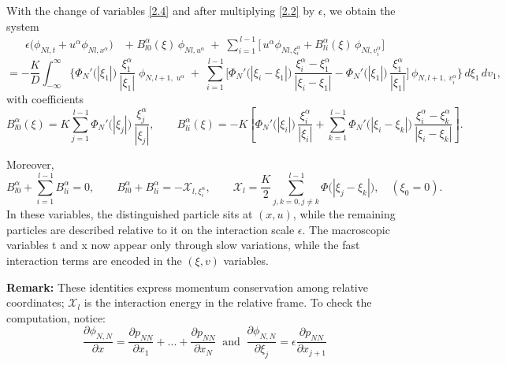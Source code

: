 \documentclass[11pt]{article}
\begin{document}
With the change of variables \eqref{2.4}  and after multiplying \eqref{2.2} by $\epsilon$, we obtain the system
\begin{equation*}\label{2.5}
\begin{aligned}
\epsilon\big(\phi_{Nl,t}+u^\alpha \phi_{Nl,x^\alpha}\big)
\;&+\; B_{l0}^\alpha(\xi)\,\phi_{Nl,u^\alpha}
\;+\; \sum_{i=1}^{\,l-1}\big[\,u^\alpha \phi_{Nl,\xi_i^\alpha}+B_{li}^\alpha(\xi)\,\phi_{Nl,v_i^\alpha}\big]
\end{aligned}
\tag{2.5}
\end{equation*}
\begin{equation*}
    =
-\frac{K}{D}\int_{-\infty}^{\infty}
\bigg\{
\Phi_N'\big(|\xi_1|\big)\,\frac{\xi_1^\alpha}{|\xi_1|}
\;\phi_{N,l+1,\;u^\alpha}
\;+\;
\sum_{i=1}^{\,l-1}
\bigg[
\Phi_N'\big(|\xi_i-\xi_1|\big)\,\frac{\xi_i^\alpha-\xi_1^\alpha}{|\xi_i-\xi_1|}
-
\Phi_N'\big(|\xi_1|\big)\,\frac{\xi_1^\alpha}{|\xi_1|}
\bigg]\,
\phi_{N,l+1,\;v_i^\alpha}
\bigg\}\,d\xi_1\,dv_1,
\end{equation*}
with coefficients
\begin{equation*}
B_{l0}^\alpha(\xi)=K\sum_{j=1}^{\,l-1}\Phi_N'\big(|\xi_j|\big)\,\frac{\xi_j^\alpha}{|\xi_j|},
\qquad
B_{li}^\alpha(\xi)
=-K\left[\Phi_N'\big(|\xi_i|\big)\,\frac{\xi_i^\alpha}{|\xi_i|}
+\sum_{k=1}^{\,l-1}\Phi_N'\big(|\xi_i-\xi_k|\big)\,\frac{\xi_i^\alpha-\xi_k^\alpha}{|\xi_i-\xi_k|}\right].
\end{equation*}

Moreover,
\[\tag{2.6}\label{2.6}
B_{l0}^\alpha+\sum_{i=1}^{\,l-1}B_{li}^\alpha=0,
\qquad
B_{l0}^\alpha+B_{li}^\alpha=-\mathcal{X}_{l,\xi_i^\alpha},
\qquad
\mathcal{X}_l=\frac{K}{2}\sum_{j,k=0,j\neq k}^{\,l-1}\Phi\big(|\xi_j-\xi_k|\big),
\quad (\xi_0=0).
\]
In these variables, the distinguished particle sits at $(x,u)$, while the remaining particles are described relative to it on the interaction scale $\epsilon$. The macroscopic variables t and x now appear only through slow variations, while the fast interaction terms are encoded in the $(\xi,v)$ variables.

\textbf{Remark:} These identities express momentum conservation among relative coordinates; $\mathcal{X}_l$ is the interaction energy in the relative frame. To check the computation, notice:
\begin{equation*}
    \frac{\partial \phi_{N,N}}{\partial x}=\frac{\partial p_{NN}}{\partial x_1}+...+\frac{\partial p_{NN}}{\partial x_N}\;\;\text{and}\;\; \frac{\partial \phi_{N,N}}{\partial \xi_j}=\epsilon\frac{\partial p_{NN}}{\partial x_{j+1}}
\end{equation*}
\end{document}
